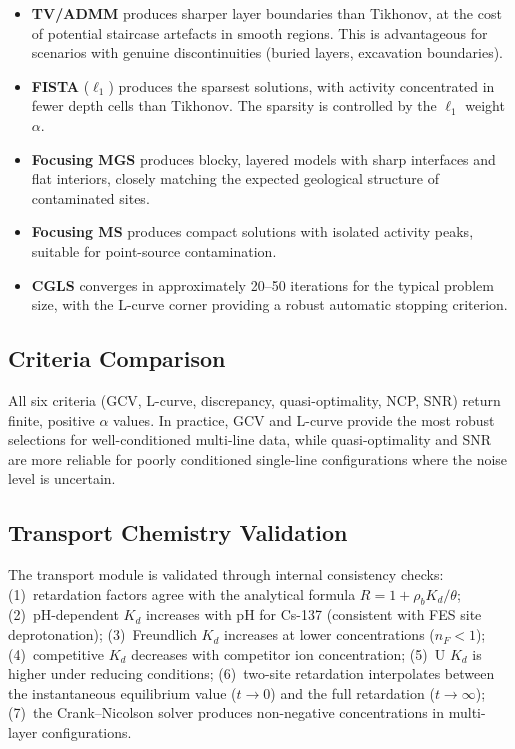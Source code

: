 \documentclass[a4paper,11pt]{article}
\begin{document}
\begin{itemize}
  \item \textbf{TV/ADMM} produces sharper layer boundaries than Tikhonov,
        at the cost of potential staircase artefacts in smooth regions.
        This is advantageous for scenarios with genuine discontinuities
        (buried layers, excavation boundaries).
  \item \textbf{FISTA} ($\ell_1$) produces the sparsest solutions, with
        activity concentrated in fewer depth cells than Tikhonov.
        The sparsity is controlled by the $\ell_1$ weight $\alpha$.
  \item \textbf{Focusing MGS} produces blocky, layered models with
        sharp interfaces and flat interiors, closely matching the
        expected geological structure of contaminated sites.
  \item \textbf{Focusing MS} produces compact solutions with isolated
        activity peaks, suitable for point-source contamination.
  \item \textbf{CGLS} converges in approximately 20--50 iterations
        for the typical problem size, with the L-curve corner
        providing a robust automatic stopping criterion.
\end{itemize}

\subsection{Criteria Comparison}

All six criteria (GCV, L-curve, discrepancy, quasi-optimality, NCP, SNR)
return finite, positive $\alpha$ values.  In practice, GCV and L-curve
provide the most robust selections for well-conditioned multi-line data,
while quasi-optimality and SNR are more reliable for poorly conditioned
single-line configurations where the noise level is uncertain.

\subsection{Transport Chemistry Validation}

The transport module is validated through internal consistency checks:
(1)~retardation factors agree with the analytical formula $R = 1 + \rho_b K_d/\theta$;
(2)~pH-dependent $K_d$ increases with pH for Cs-137 (consistent with
FES site deprotonation); (3)~Freundlich $K_d$ increases at lower
concentrations ($n_F < 1$); (4)~competitive $K_d$ decreases with
competitor ion concentration; (5)~U $K_d$ is higher under reducing
conditions; (6)~two-site retardation interpolates between the
instantaneous equilibrium value ($t \to 0$) and the full
retardation ($t \to \infty$); (7)~the Crank--Nicolson solver produces
non-negative concentrations in multi-layer configurations.
\end{document}
